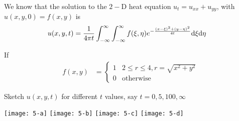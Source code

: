 \item We know that the solution to the $2-$D heat equation
$u_t = u_{xx} + u_{yy}$, with $u(x, y, 0) = f(x, y)$ is
%
\begin{align}
  u(x, y, t)
  & = \frac{1}{4 \pi t} \int^\infty_{-\infty} \int^\infty_{-\infty}
  f(\xi, \eta) e^{-\frac{(x - \xi)^2 + (y - \eta)^2}{4t}} \text d\xi \text d\eta
\end{align}

If
%
\begin{align}
  f(x, y) & =
  \begin{cases}
    1 & 2 \leq r \leq 4, r = \sqrt{x^2 + y^2}\\
    0 & \text{otherwise}
  \end{cases}
\end{align}

Sketch $u(x, y, t)$ for different $t$ values, say $t = 0, 5, 100, \infty$
\bigbreak

\begin{center}
  \texttt{[image: 5-a]}
  \texttt{[image: 5-b]}
  \texttt{[image: 5-c]}
  \texttt{[image: 5-d]}
\end{center}
